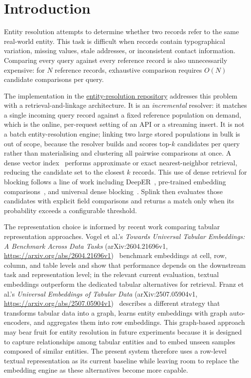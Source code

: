 \documentclass[11pt]{article}
\begin{document}
\section{Introduction}
Entity resolution attempts to determine whether two records refer to the same real-world entity. This task is difficult when records contain typographical variation, missing values, stale addresses, or inconsistent contact information. Comparing every query against every reference record is also unnecessarily expensive: for $N$ reference records, exhaustive comparison requires $O(N)$ candidate comparisons per query.

The implementation in the \href{https://github.com/denisrobert/entity-resolution}{entity-resolution repository} addresses this problem with a retrieval-and-linkage architecture. It is an \emph{incremental} resolver: it matches a single incoming query record against a fixed reference population on demand, which is the online, per-request setting of an API or a streaming insert. It is not a batch entity-resolution engine; linking two large stored populations in bulk is out of scope, because the resolver builds and scores top-$k$ candidates per query rather than materialising and clustering all pairwise comparisons at once. A dense vector index~\cite{johnson2019} performs approximate or exact nearest-neighbor retrieval, reducing the candidate set to the closest $k$ records. This use of dense retrieval for blocking follows a line of work including DeepER~\cite{ebreheem2018}, pre-trained embedding comparisons~\cite{zeakis2023}, and universal dense blocking~\cite{wang2024}. Splink then evaluates those candidates with explicit field comparisons and returns a match only when its probability exceeds a configurable threshold.

The representation choice is informed by recent work comparing tabular representation approaches. Vogel et al.'s \emph{Towards Universal Tabular Embeddings: A Benchmark Across Data Tasks} (arXiv:2604.21696v1, \url{https://arxiv.org/abs/2604.21696v1})~\cite{vogel2026} benchmark embeddings at cell, row, column, and table levels and show that performance depends on the downstream task and representation level; in the relevant current evaluation, textual embeddings outperform the dedicated tabular alternatives for retrieval. Franz et al.'s \emph{Universal Embeddings of Tabular Data} (arXiv:2507.05904v1, \url{https://arxiv.org/abs/2507.05904v1})~\cite{franz2025} describes a different strategy that transforms tabular data into a graph, learns entity embeddings with graph auto-encoders, and aggregates them into row embeddings. This graph-based approach may bear fruit for entity resolution in future experiments because it is designed to capture relationships among tabular entities and to embed unseen samples composed of similar entities. The present system therefore uses a row-level textual representation as its current baseline while leaving room to replace the embedding engine as these alternatives become more capable.
\end{document}

